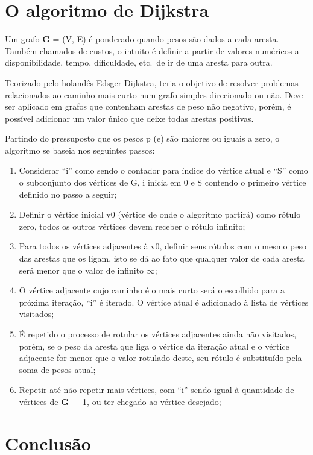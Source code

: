 \documentclass[a4paper, 12pt]{article}
\begin{document}
\section{O algoritmo de Dijkstra}
Um grafo \textbf{G} = (V, E) é ponderado quando pesos são dados a cada aresta. Também chamados de custos, o intuito é definir a partir de valores numéricos a disponibilidade, tempo, dificuldade, etc.\ de ir de uma aresta para outra.

Teorizado pelo holandês Edsger Dijkstra, teria o objetivo de resolver problemas relacionados ao caminho mais curto num grafo simples direcionado ou não. Deve ser aplicado em grafos que contenham arestas de peso não negativo, porém, é possível adicionar um valor único que deixe todas arestas positivas.

Partindo do pressuposto que os pesos p (e) são maiores ou iguais a zero, o algoritmo se baseia nos seguintes passos:

\begin{enumerate}
	\item Considerar ``i'' como sendo o contador para índice do vértice atual e ``S'' como o subconjunto dos vértices de G, i inicia em 0 e S contendo o primeiro vértice definido no passo a seguir;
	\item Definir o vértice inicial v0 (vértice de onde o algoritmo partirá) como rótulo zero, todos os outros vértices devem receber o rótulo infinito;
	\item Para todos os vértices adjacentes à v0, definir seus rótulos com o mesmo peso das arestas que os ligam, isto se dá ao fato que qualquer valor de cada aresta será menor que o valor de infinito {$\infty$};

	\item O vértice adjacente cujo caminho é o mais curto será o escolhido para a próxima iteração, ``i'' é iterado. O vértice atual é adicionado à lista de vértices visitados;
	\item É repetido o processo de rotular os vértices adjacentes ainda não visitados, porém, se o peso da aresta que liga o vértice da iteração atual e o vértice adjacente for menor que o valor rotulado deste, seu rótulo é substituído pela soma de pesos atual;
	\item Repetir até não repetir mais vértices, com ``i'' sendo igual à quantidade de vértices de \textbf{G} --- 1, ou ter chegado ao vértice desejado;

\end{enumerate}
\section{Conclusão}
\end{document}
